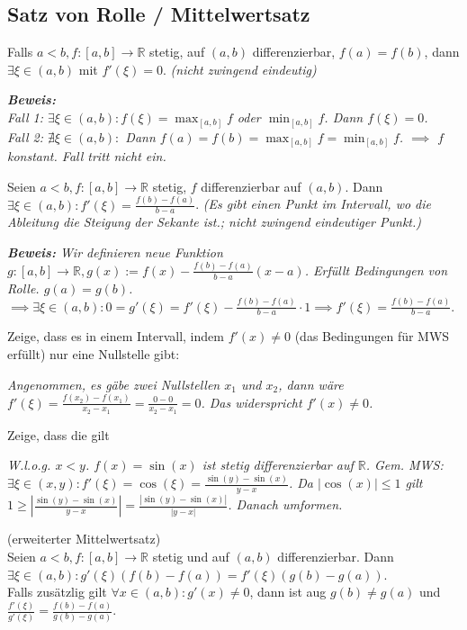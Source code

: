 \subsection{Satz von Rolle / Mittelwertsatz}

Falls $a<b, f:[a,b]\rightarrow \mathbb{R}$ stetig, auf $(a,b)$ differenzierbar, $f(a)=f(b)$, dann $\exists \xi \in (a,b)$ mit $f'(\xi)=0$.
\textit{(nicht zwingend eindeutig)}

\textit{\textbf{Beweis:}\\
Fall 1: $\exists \xi \in (a,b): f(\xi)= \max_{[a,b]} f$ oder $\min_{[a,b]} f $. Dann $f(\xi)=0$.\\
Fall 2: $\nexists \xi \in (a,b):$ Dann $f(a)=f(b)= \max_{[a,b]}f=\min_{[a,b]}f$. $\implies$ $f$ konstant. Fall tritt nicht ein.}

Seien $a<b, f:[a,b]\rightarrow \mathbb{R}$ stetig, $f$ differenzierbar auf $(a,b)$. Dann $\exists \xi \in (a,b): f'(\xi)=\frac{f(b)-f(a)}{b-a}$.
\textit{(Es gibt einen Punkt im Intervall, wo die Ableitung die Steigung der Sekante ist.; nicht zwingend eindeutiger Punkt.)}

\textit{\textbf{Beweis:}
Wir definieren neue Funktion $g:[a,b]\rightarrow \mathbb{R}, g(x):= f(x)-\frac{f(b)-f(a)}{b-a}(x-a)$. Erfüllt Bedingungen von Rolle. $g(a)=g(b)$. $\implies \exists \xi \in (a,b): 0=g'(\xi)=f'(\xi)-\frac{f(b)-f(a)}{b-a} \cdot 1 \implies f'(\xi)=\frac{f(b)-f(a)}{b-a}.$ }

\begin{exercise}
    Zeige, dass es in einem Intervall, indem $f'(x)\neq 0$ (das Bedingungen für MWS erfüllt) nur eine Nullstelle gibt:

    \textit{Angenommen, es gäbe zwei Nullstellen $x_1$ und $x_2$, dann wäre $f'(\xi)=\frac{f(x_2)-f(x_1)}{x_2 - x_1}=\frac{0-0}{x_2-x_1}=0$. Das widerspricht $f'(x)\neq 0$.}
\end{exercise}

\begin{exercise}
    Zeige, dass die  gilt

    \textit{W.l.o.g. $x<y$. $f(x)=\sin(x)$ ist stetig differenzierbar auf $\mathbb{R}$. Gem. MWS: $\exists \xi \in (x,y): f'(\xi)=\cos(\xi)=\frac{\sin(y)-\sin(x)}{y-x}$. Da $|\cos(x)|\leq 1$ gilt $1 \geq |\frac{\sin(y)-\sin(x)}{y-x}|=\frac{|\sin(y)-\sin(x)|}{|y-x|}$. Danach umformen.}
\end{exercise}

 (erweiterter Mittelwertsatz)\\
Seien $a<b, f:[a,b]\rightarrow\mathbb{R}$ stetig und auf $(a,b)$ differenzierbar. Dann $\exists \xi \in (a,b) :g'(\xi)(f(b)-f(a))=f'(\xi)(g(b)-g(a))$.\\
Falls zusätzlig gilt $\forall x \in (a,b): g'(x) \neq 0$, dann ist aug $g(b)\neq g(a)$ und $\frac{f'(\xi)}{g'(\xi)}=\frac{f(b)-f(a)}{g(b)-g(a)}$.

